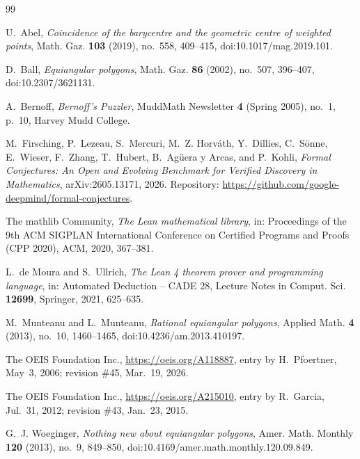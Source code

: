 \documentclass[11pt]{amsart}
\theoremstyle{plain}
\theoremstyle{definition}
\begin{document}
{\small
\begin{thebibliography}{99}

U.~Abel, \emph{Coincidence of the barycentre and the geometric centre of weighted points}, Math. Gaz. \textbf{103} (2019), no.~558, 409--415, doi:10.1017/mag.2019.101.

D.~Ball, \emph{Equiangular polygons}, Math. Gaz. \textbf{86} (2002), no.~507, 396--407, doi:10.2307/3621131.

A.~Bernoff, \emph{Bernoff's Puzzler}, MuddMath Newsletter \textbf{4} (Spring 2005), no.~1, p.~10, Harvey Mudd College.

M.~Firsching, P.~Lezeau, S.~Mercuri, M.~Z. Horv\'ath, Y.~Dillies, C.~S\"onne, E.~Wieser, F.~Zhang, T.~Hubert, B.~Ag\"uera y Arcas, and P.~Kohli, \emph{Formal Conjectures: An Open and Evolving Benchmark for Verified Discovery in Mathematics}, arXiv:2605.13171, 2026. Repository: \url{https://github.com/google-deepmind/formal-conjectures}.

The mathlib Community, \emph{The Lean mathematical library}, in: Proceedings of the 9th ACM SIGPLAN International Conference on Certified Programs and Proofs (CPP 2020), ACM, 2020, 367--381.

L.~de Moura and S.~Ullrich, \emph{The Lean 4 theorem prover and programming language}, in: Automated Deduction -- CADE 28, Lecture Notes in Comput. Sci. \textbf{12699}, Springer, 2021, 625--635.

M.~Munteanu and L.~Munteanu, \emph{Rational equiangular polygons}, Applied Math. \textbf{4} (2013), no.~10, 1460--1465, doi:10.4236/am.2013.410197.

The OEIS Foundation Inc., \url{https://oeis.org/A118887}, entry by H.~Pfoertner, May~3, 2006; revision \#45, Mar.~19, 2026.

The OEIS Foundation Inc., \url{https://oeis.org/A215010}, entry by R.~Garcia, Jul.~31, 2012; revision \#43, Jan.~23, 2015.

G.~J. Woeginger, \emph{Nothing new about equiangular polygons}, Amer. Math. Monthly \textbf{120} (2013), no.~9, 849--850, doi:10.4169/amer.math.monthly.120.09.849.

\end{thebibliography}
}
\end{document}
